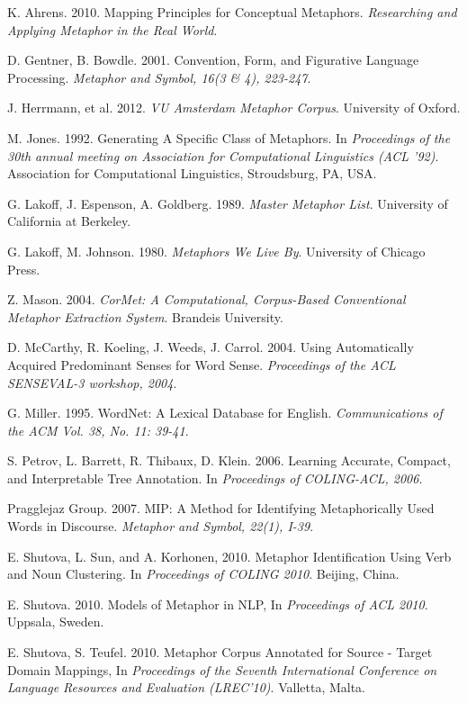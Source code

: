 \documentclass[12pt]{article}
\begin{document}
\newpage
\begin{thebibliography}{99}

  K. Ahrens. 2010.
  Mapping Principles for Conceptual Metaphors.
  \emph{Researching and Applying Metaphor in the Real World}.

  D. Gentner, B. Bowdle. 2001.
  Convention, Form, and Figurative Language Processing.
  \emph{Metaphor and Symbol, 16(3 \& 4), 223-247}.

  J. Herrmann, et al.  2012.
  \emph{VU Amsterdam Metaphor Corpus}.
  University of Oxford.

  M. Jones. 1992.
  Generating A Specific Class of Metaphors.
  In \emph{Proceedings of the 30th annual meeting on Association for Computational Linguistics (ACL '92)}. Association for Computational Linguistics, Stroudsburg, PA, USA.
 
  G. Lakoff, J. Espenson, A. Goldberg. 1989.
  \emph{Master Metaphor List}.
  University of California at Berkeley.
  
  G. Lakoff, M. Johnson. 1980.
  \emph{Metaphors We Live By}.
  University of Chicago Press.

  Z. Mason. 2004.
  \emph{CorMet: A Computational, Corpus-Based Conventional Metaphor Extraction System}.
  Brandeis University.

  D. McCarthy, R. Koeling, J. Weeds, J. Carrol. 2004.
  Using Automatically Acquired Predominant Senses for Word Sense.
  \emph{Proceedings of the ACL SENSEVAL-3 workshop, 2004}.

  G. Miller. 1995.
  WordNet: A Lexical Database for English.
  \emph{Communications of the ACM Vol. 38, No. 11: 39-41}.

  S. Petrov, L. Barrett, R. Thibaux, D. Klein. 2006.
  Learning Accurate, Compact, and Interpretable Tree Annotation.
  In \emph{Proceedings of COLING-ACL, 2006}.

  Pragglejaz Group. 2007.
  MIP: A Method for Identifying Metaphorically Used Words in Discourse.
  \emph{Metaphor and Symbol, 22(1), I-39}.

  E. Shutova, L. Sun, and A. Korhonen, 2010.
  Metaphor Identification Using Verb and Noun Clustering.
  In \emph{Proceedings of COLING 2010}.
  Beijing, China.
  
  E. Shutova. 2010.
  Models of Metaphor in NLP,
  In \emph{Proceedings of ACL 2010}.
  Uppsala, Sweden.

 E. Shutova, S. Teufel. 2010.
 Metaphor Corpus Annotated for Source - Target Domain Mappings,
 In \emph{Proceedings of the Seventh International Conference on Language Resources and Evaluation (LREC'10)}.
 Valletta, Malta.

\end{thebibliography}
\end{document}

